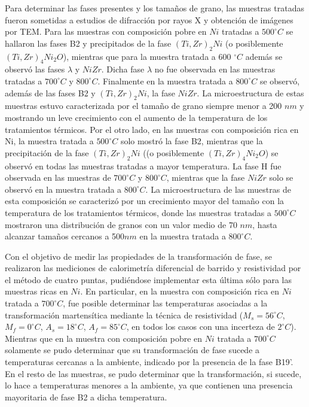 \documentclass[12pt]{article}
\theoremstyle{definition}
\theoremstyle{remark}
\begin{document}
Para determinar las fases presentes y los tamaños de grano, las muestras tratadas fueron sometidas a estudios de difracción por rayos X y obtención de imágenes por TEM. Para las muestras con composición pobre en $Ni$ tratadas a $500^\circ C$ se hallaron las fases B2 y precipitados de la fase $(Ti, Zr)_2Ni$ (o posiblemente $(Ti, Zr)_4Ni_2O$), mientras que para la muestra tratada a $600$ $^\circ C$ además se observó las fases $\lambda$ y $NiZr$. Dicha fase $\lambda$ no fue observada en las muestras tratadas a $700^\circ C$ y $800^\circ C$. Finalmente en la muestra tratada a $800^\circ C$ se observó, además de las fases B2 y $(Ti, Zr)_2Ni$, la fase $NiZr$. La microestructura de estas muestras estuvo caracterizada por el tamaño de grano siempre menor a 200 $nm$ y mostrando un leve crecimiento con el aumento de la temperatura de los tratamientos térmicos. Por el otro lado, en las muestras con composición rica en Ni, la muestra tratada a $500^\circ C$ solo mostró la fase B2, mientras que la precipitación de la fase $(Ti, Zr)_2Ni$ ((o posiblemente $(Ti, Zr)_4Ni_2O$) se observó en todas las muestras tratadas a mayor temperatura. La fase H fue observada en las muestras de $700^\circ C$ y $800^\circ C$, mientras que la fase $NiZr$ solo se observó en la muestra tratada a $800^\circ C$. La microestructura de las muestras de esta composición se caracterizó por un crecimiento mayor del tamaño con la temperatura de los tratamientos térmicos, donde las muestras tratadas a $500^\circ C$ mostraron una distribución de granos con un valor medio de  70 $nm$, hasta alcanzar tamaños cercanos a 500$nm$ en la muestra tratada a $800^\circ C$.

Con el objetivo de medir las propiedades de la transformación de fase, se realizaron las mediciones de calorimetría diferencial de barrido y resistividad por el método de cuatro puntas, pudiéndose implementar esta última sólo para las muestras ricas en $Ni$. En particular, en la muestra con composición rica en $Ni$ tratada a $700^\circ C$, fue posible determinar las temperaturas asociadas a la transformación martensítica mediante la técnica de resistividad ($M_s=56^\circ C$, $M_f=0^\circ C$, $A_s=18^\circ C$, $A_f=85^\circ C$, en todos los casos con una incerteza de $2^\circ C$). Mientras que en la muestra con composición pobre en $Ni$ tratada a $700^\circ C$ solamente se pudo determinar que su transformación de fase sucede a temperaturas cercanas a la ambiente, indicado por la presencia de la fase B19'. En el resto de las muestras, se pudo determinar que la transformación, si sucede, lo hace a temperaturas menores a la ambiente, ya que contienen una presencia mayoritaria de fase B2 a dicha temperatura.
\end{document}
